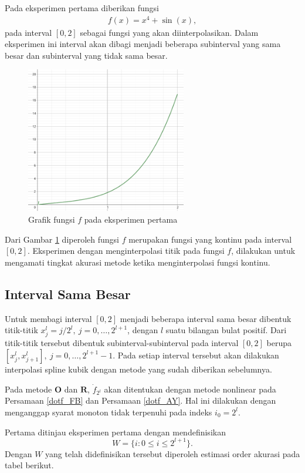 Pada eksperimen pertama diberikan fungsi
\begin{align*}
    f(x) = x^4 + \sin(x),
\end{align*}
pada interval $[0,2]$ sebagai fungsi yang akan diinterpolasikan. Dalam eksperimen ini interval akan dibagi menjadi beberapa subinterval yang sama besar dan subinterval yang tidak sama besar.

\begin{figure}[htp]
    \centering
    \includegraphics[width=7cm]{Images/figure_2/percobaanSatu.png}
    \caption{Grafik fungsi $f$ pada eksperimen pertama}
    \label{grafikf1}
\end{figure}

Dari Gambar \ref{grafikf1} diperoleh fungsi $f$ merupakan fungsi yang kontinu pada interval $[0,2]$. Eksperimen dengan menginterpolasi titik pada fungsi $f$, dilakukan untuk mengamati tingkat akurasi metode ketika menginterpolasi fungsi kontinu.
\subsection{Interval Sama Besar}

Untuk membagi interval $[0,2]$ menjadi beberapa interval sama besar dibentuk titik-titik $x_j^l = j/2^l, ~ j=0,\dots,2^{l+1}$, dengan $l$ suatu bilangan bulat positif. Dari titik-titik tersebut dibentuk subinterval-subinterval pada interval $[0,2]$ berupa $[x_j^l, x_{j+1}^l], ~ j=0,\dots,2^{l+1}-1$. Pada setiap interval tersebut akan dilakukan interpolasi spline kubik dengan metode yang sudah diberikan sebelumnya.

Pada metode $\textbf{O}$ dan $\textbf{R}$, $\dot{f}_{2^l}$ akan ditentukan dengan metode nonlinear pada Persamaan \eqref{dotf_FB} dan Persamaan \eqref{dotf_AY}. Hal ini dilakukan dengan menganggap syarat monoton tidak terpenuhi pada indeks $i_0 = 2^l$.

Pertama ditinjau eksperimen pertama dengan mendefinisikan $$W = \{ i : 0 \leq i \leq 2^{l+1}\}.$$ Dengan $W$ yang telah didefinisikan tersebut diperoleh estimasi order akurasi pada tabel berikut.

